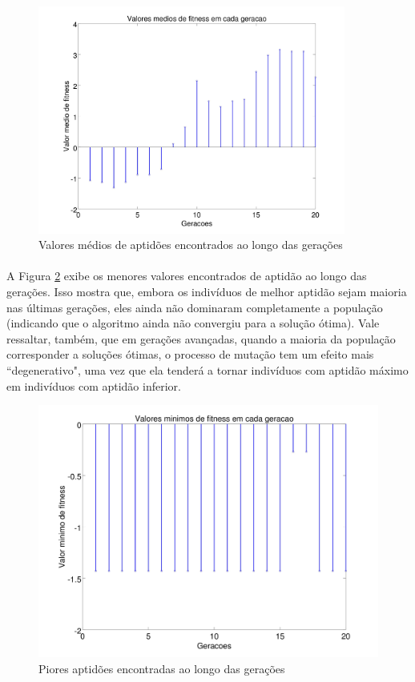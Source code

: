 \documentclass{report}
\begin{document}
	\begin{figure}[H]
		\centering
		\includegraphics[width=0.9\textwidth]{Q01_media_fitness.jpg}
		\caption{Valores médios de aptidões encontrados ao longo das gerações}
		\label{media_fitness}
	\end{figure}
	
	\paragraph{} A Figura \ref{piores_fitness} exibe os menores valores encontrados de aptidão ao longo das gerações. Isso mostra que, embora os indivíduos de melhor aptidão sejam maioria nas últimas gerações, eles ainda não dominaram completamente a população (indicando que o algoritmo ainda não convergiu para a solução ótima). Vale ressaltar, também, que em gerações avançadas, quando a maioria da população corresponder a soluções ótimas, o processo de mutação tem um efeito mais ``degenerativo", uma vez que ela tenderá a tornar indivíduos com aptidão máximo em indivíduos com aptidão inferior.\\
	
	\begin{figure}[H]
		\centering
		\includegraphics[width=\textwidth]{Q01_piores_fitness.jpg}
		\caption{Piores aptidões encontradas ao longo das gerações}
		\label{piores_fitness}
	\end{figure}
\end{document}
